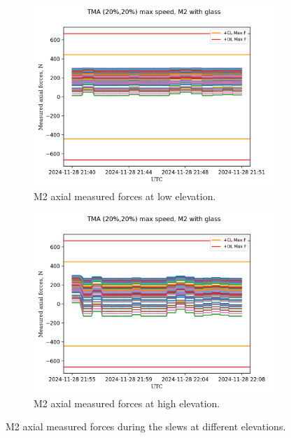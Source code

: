 \begin{figure}
    \centering
    \begin{subfigure}[b]{0.45\textwidth}
        \centering
        \includegraphics[width=\textwidth]{spa/20_vel_acc_jerk/BLOCK-T227_m2_axial_measured_forces.png}
        \caption{M2 axial measured forces at low elevation.}
        \label{fig:block227_m2_axial_measured_forces}
    \end{subfigure}
    \hfill
    \begin{subfigure}[b]{0.45\textwidth}
        \centering
        \includegraphics[width=\textwidth]{spa/20_vel_acc_jerk/BLOCK-T293_m2_axial_measured_forces.png}
        \caption{M2 axial measured forces at high elevation.}
        \label{fig:block293_m2_axial_measured_forces}
    \end{subfigure}
    \caption{M2 axial measured forces during the slews at different elevations.}
    \label{fig:m2_axial_measured_forces}
\end{figure}

